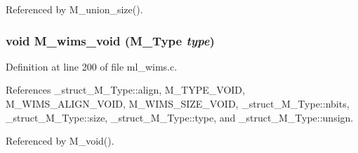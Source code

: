Referenced by M\_\-union\_\-size().
\subsubsection{\setlength{\rightskip}{0pt plus 5cm}void M\_\-wims\_\-void (\bf{M\_\-Type} {\em type})}\label{ml__wims_8c_80f549af8edd654d729ec810b32913b6}




Definition at line 200 of file ml\_\-wims.c.

References \_\-struct\_\-M\_\-Type::align, M\_\-TYPE\_\-VOID, M\_\-WIMS\_\-ALIGN\_\-VOID, M\_\-WIMS\_\-SIZE\_\-VOID, \_\-struct\_\-M\_\-Type::nbits, \_\-struct\_\-M\_\-Type::size, \_\-struct\_\-M\_\-Type::type, and \_\-struct\_\-M\_\-Type::unsign.

Referenced by M\_\-void().